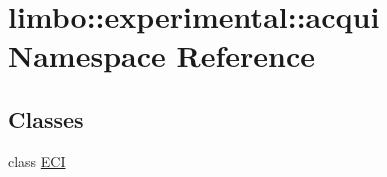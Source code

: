 \hypertarget{namespacelimbo_1_1experimental_1_1acqui}{}\section{limbo\+:\+:experimental\+:\+:acqui Namespace Reference}
\label{namespacelimbo_1_1experimental_1_1acqui}
\subsection*{Classes}
\begin{DoxyCompactItemize}
\item 
class \hyperlink{classlimbo_1_1experimental_1_1acqui_1_1_e_c_i}{E\+CI}
\end{DoxyCompactItemize}
